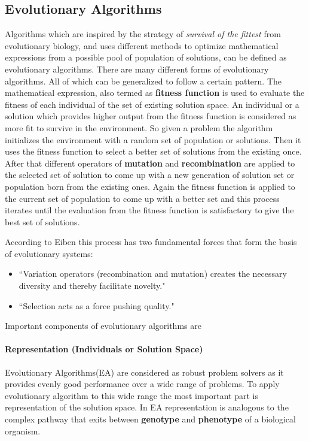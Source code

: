 \subsection{Evolutionary Algorithms}
Algorithms which are inspired by the strategy of \textit{survival of the fittest} from evolutionary biology, and uses different methods to optimize mathematical expressions from a possible pool of population of solutions, can be defined as evolutionary algorithms. There are many different forms of evolutionary algorithms. All of which can be generalized to follow a certain pattern. The mathematical expression, also termed as \textbf{fitness function} is used to evaluate the fitness of each individual of the set of existing solution space. An individual or a solution which provides higher output from the fitness function is considered as more fit to survive in the environment. So given a problem the algorithm initializes the environment with a random set of population or solutions. Then it uses the fitness function to select a better set of solutions from the existing once. After that different operators of \textbf{mutation} and \textbf{recombination} are applied to the selected set of solution to come up with a new generation of solution set or population born from the existing ones. Again the fitness function is applied to the current set of population to come up with a better set and this process iterates until the evaluation from the fitness function is satisfactory to give the best set of solutions.

According to Eiben \cite{eiben2003} this process has two fundamental forces that form the basis of evolutionary systems:

\begin{itemize}
	\item ``Variation operators (recombination and mutation) creates the necessary diversity and thereby facilitate novelty."
	\item ``Selection acts as a force pushing quality."
\end{itemize}

Important components of evolutionary algorithms are

\paragraph{Representation (Individuals or Solution Space)}
Evolutionary Algorithms(EA) are considered as robust problem solvers as it provides evenly good performance over a wide range of problems. To apply evolutionary algorithm to this wide range the most important part is representation of the solution space. In EA representation is analogous to the complex pathway that exits between \textbf{genotype} and \textbf{phenotype} of a biological organism.

